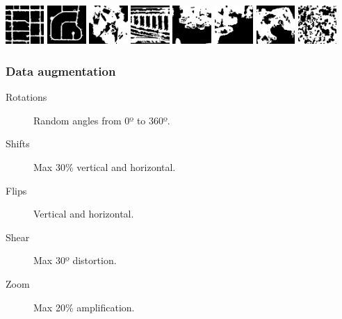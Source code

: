 \documentclass[usenames,dvipsnames,10pt]{beamer}
\begin{document}
\begin{frame}
\vspace{0.25cm}

\includegraphics[width=0.11\textwidth]{graphics/aerial01-trav.jpg}
\includegraphics[width=0.11\textwidth]{graphics/aerial02-trav.jpg}
\includegraphics[width=0.11\textwidth]{graphics/aerial03-trav.jpg}
\includegraphics[width=0.11\textwidth]{graphics/aerial04-trav.jpg}
\includegraphics[width=0.11\textwidth]{graphics/aerial05-trav.jpg}
\includegraphics[width=0.11\textwidth]{graphics/aerial06-trav.jpg}
\includegraphics[width=0.11\textwidth]{graphics/aerial07-trav.jpg}
\includegraphics[width=0.11\textwidth]{graphics/aerial08-trav.jpg}

\centering\tiny{}
\end{frame}

\begin{frame}
\frametitle{Data augmentation}
\begin{description}
	\item[Rotations] Random angles from 0º to 360º.
	\item[Shifts] Max 30\% vertical and horizontal.
	\item[Flips] Vertical and horizontal.
	\item[Shear] Max 30º distortion.
	\item[Zoom] Max 20\% amplification.
\end{description}
\end{frame}
\end{document}
